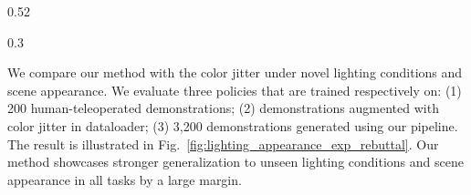\documentclass[conference]{IEEEtran}
\begin{document}

% 


\vspace{-4mm}


\begin{table}[h]
\raggedright
\begin{subtable}[t]{0.52\linewidth}
    \caption{\textbf{Camera view (\%)}}
    
    \label{tab:camera_view_exp_rebuttal}
\end{subtable}
\begin{subtable}[t]{0.3\linewidth}
    \caption{\textbf{Object type (\%)}}
    
    \label{tab:object_type_exp_rebuttal}
\end{subtable}
\caption{\textbf{Comparison with baselines.}}
\vspace{-2mm}
\end{table}


%     
%     

\vspace{-3mm}


We compare our method with the color jitter under novel lighting conditions and scene appearance.
We evaluate three policies that are trained respectively on:
(1) 200 human-teleoperated demonstrations;
(2) demonstrations augmented with color jitter in dataloader;
(3) 3,200 demonstrations generated using our pipeline.
The result is illustrated in Fig.~\ref{fig:lighting_appearance_exp_rebuttal}.
Our method showcases stronger generalization to unseen lighting conditions and scene appearance in all tasks by a large margin.
\end{document}
